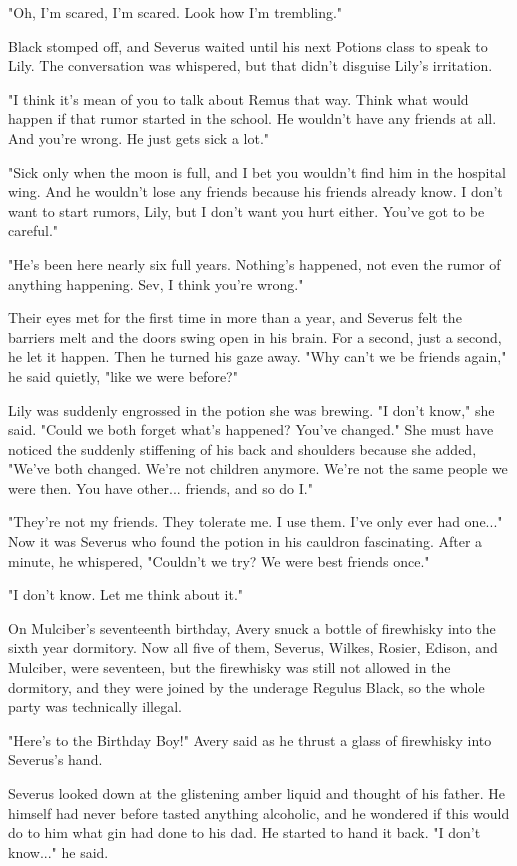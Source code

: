 \documentclass[a4paper,11pt]{article}
\begin{document}
"Oh, I'm scared, I'm scared. Look how I'm trembling."

Black stomped off, and Severus waited until his next Potions class to speak to Lily. The conversation was whispered, but that didn't disguise Lily's irritation.

"I think it's mean of you to talk about Remus that way. Think what would happen if that rumor started in the school. He wouldn't have any friends at all. And you're wrong. He just gets sick a lot."

"Sick only when the moon is full, and I bet you wouldn't find him in the hospital wing. And he wouldn't lose any friends because his friends already know. I don't want to start rumors, Lily, but I don't want you hurt either. You've got to be careful."

"He's been here nearly six full years. Nothing's happened, not even the rumor of anything happening. Sev, I think you're wrong."

Their eyes met for the first time in more than a year, and Severus felt the barriers melt and the doors swing open in his brain. For a second, just a second, he let it happen. Then he turned his gaze away. "Why can't we be friends again," he said quietly, "like we were before?"

Lily was suddenly engrossed in the potion she was brewing. "I don't know," she said. "Could we both forget what's happened? You've changed." She must have noticed the suddenly stiffening of his back and shoulders because she added, "We've both changed. We're not children anymore. We're not the same people we were then. You have other... friends, and so do I."

"They're not my friends. They tolerate me. I use them. I've only ever had one..." Now it was Severus who found the potion in his cauldron fascinating. After a minute, he whispered, "Couldn't we try? We were best friends once."

"I don't know. Let me think about it."

On Mulciber's seventeenth birthday, Avery snuck a bottle of firewhisky into the sixth year dormitory. Now all five of them, Severus, Wilkes, Rosier, Edison, and Mulciber, were seventeen, but the firewhisky was still not allowed in the dormitory, and they were joined by the underage Regulus Black, so the whole party was technically illegal.

"Here's to the Birthday Boy!" Avery said as he thrust a glass of firewhisky into Severus's hand.

Severus looked down at the glistening amber liquid and thought of his father. He himself had never before tasted anything alcoholic, and he wondered if this would do to him what gin had done to his dad. He started to hand it back. "I don't know..." he said.
\end{document}
